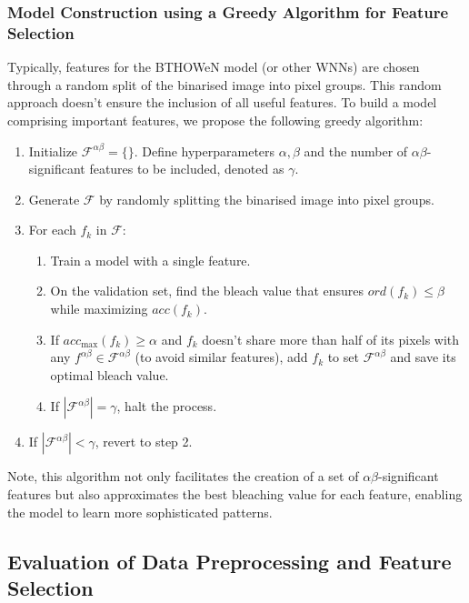 \documentclass{article}[12pt]
\begin{document}
\subsubsection*{Model Construction using a Greedy Algorithm for Feature Selection}
Typically, features for the BTHOWeN model (or other WNNs) are chosen through a random split of the binarised image into pixel groups.
This random approach doesn't ensure the inclusion of all useful features.
To build a model comprising important features, we propose the following greedy algorithm:
\begin{enumerate}
    \item
            Initialize $\mathcal{F}^{\alpha\beta} = \{\}$.
            Define hyperparameters $\alpha, \beta$ and the number of $\alpha\beta$-significant features to be included, denoted as $\gamma$.
    \item Generate $\mathcal{F}$ by randomly splitting the binarised image into pixel groups.
    \item For each $f_k$ in $\mathcal{F}$:
    \begin{enumerate}
        \item Train a model with a single feature.
        \item On the validation set, find the bleach value that ensures $ord(f_k) \le \beta$ while maximizing $acc(f_k)$.
        \item If $acc_{\max}(f_k) \ge \alpha$ and $f_k$ doesn't share more than half of its pixels with any $f^{\alpha\beta} \in \mathcal{F}^{\alpha\beta}$ (to avoid similar features), add $f_k$ to set $\mathcal{F}^{\alpha\beta}$ and save its optimal bleach value.
        \item If $|\mathcal{F}^{\alpha\beta}| = \gamma$, halt the process.
    \end{enumerate}
    \item If $|\mathcal{F}^{\alpha\beta}| < \gamma$, revert to step 2.
\end{enumerate}
Note, this algorithm not only facilitates the creation of a set of $\alpha\beta$-significant features but also approximates the best bleaching value for each feature, enabling the model to learn more sophisticated patterns.

\subsection{Evaluation of Data Preprocessing and Feature Selection}\label{subsec:evaluation-of-data-preprocessing-and-feature-selection}
\end{document}
